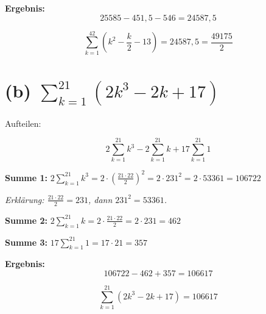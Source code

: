 \documentclass[12pt, a4paper]{article}
\begin{document}
\textbf{Ergebnis:}
\[
    25585 - 451{,}5 - 546 = 24587{,}5
\]

\[
    \boxed{\sum_{k=1}^{42} \left(k^2 - \frac{k}{2} - 13\right) = 24587{,}5 = \frac{49175}{2}}
\]

\section*{(b) $\displaystyle\sum_{k=1}^{21} \left(2k^3 - 2k + 17\right)$}

Aufteilen:

\[
    2 \sum_{k=1}^{21} k^3 - 2 \sum_{k=1}^{21} k + 17 \sum_{k=1}^{21} 1
\]

\bigskip

\textbf{Summe 1:} $\displaystyle 2 \sum_{k=1}^{21} k^3 = 2 \cdot \left(\frac{21 \cdot 22}{2}\right)^2 = 2 \cdot 231^2 = 2 \cdot 53361 = 106722$

\textit{Erklärung: $\frac{21 \cdot 22}{2} = 231$, dann $231^2 = 53361$.}

\bigskip

\textbf{Summe 2:} $\displaystyle 2 \sum_{k=1}^{21} k = 2 \cdot \frac{21 \cdot 22}{2} = 2 \cdot 231 = 462$

\bigskip

\textbf{Summe 3:} $\displaystyle 17 \sum_{k=1}^{21} 1 = 17 \cdot 21 = 357$

\bigskip

\textbf{Ergebnis:}
\[
    106722 - 462 + 357 = 106617
\]

\[
    \boxed{\sum_{k=1}^{21} \left(2k^3 - 2k + 17\right) = 106617}
\]
\end{document}
